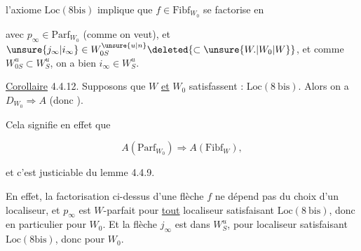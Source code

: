 
 l'axiome $\mathrm{Loc}(8\mathrm{bis})$ implique que $f\in\mathrm{Fibf}_{W_0}$ se factorise en



avec $p_\infty\in\mathrm{Parf}_{W_0}$ (comme on veut), et $\unsure{j_\infty|i_\infty}\in W_{0S}^{\unsure{u|n}}\deleted{\subset\unsure{W.|W_0|W}}$, et comme $W_{0S}^{u}\subset W_S^{u}$, on a bien $i_\infty\in W_S^{u}$.

\uline{Corollaire} 4.4.12. Supposons que $W$ \uline{et} $W_0$ satisfassent : $\mathrm{Loc}(8\ \mathrm{bis})$. Alors on a $D_{W_0}\Longrightarrow A$ (donc ).

Cela signifie en effet que

\[
 A(\mathrm{Parf}_{W_0})\Longrightarrow A(\mathrm{Fibf}_W),
\]

et c'est  justiciable du lemme 4.4.9.

En effet, la factorisation ci-dessus d'une flèche $f$ ne dépend pas du choix d'un localiseur, et $p_\infty$ est $W$-parfait pour \uline{tout} localiseur satisfaisant $\mathrm{Loc}(8\ \mathrm{bis})$, donc en particulier pour $W_0$. Et la flèche $j_\infty$ est dans $W_S^u$, pour  localiseur satisfaisant $\mathrm{Loc}(8\mathrm{bis})$, donc pour $W_0$.
